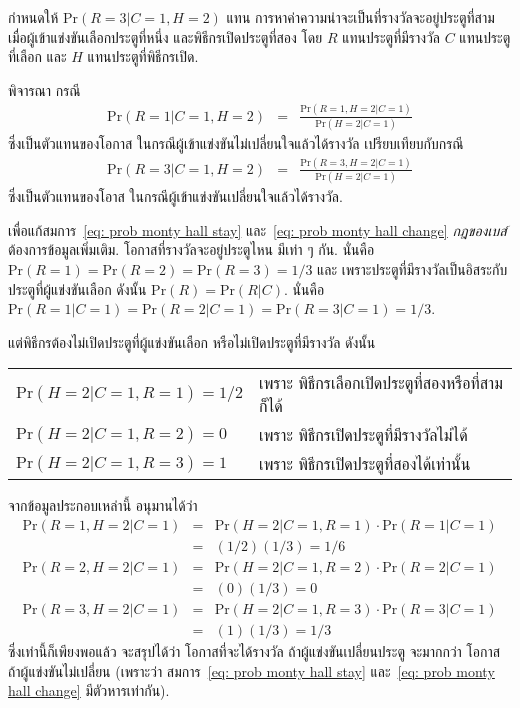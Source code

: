 กำหนดให้
$\mathrm{Pr}(R = 3|C = 1, H = 2)$
แทน
การหาค่าความน่าจะเป็นที่รางวัลจะอยู่ประตูที่สาม
เมื่อผู้เข้าแข่งขันเลือกประตูที่หนึ่ง
และพิธีกรเปิดประตูที่สอง
โดย $R$ แทนประตูที่มีรางวัล
$C$ แทนประตูที่เลือก
และ $H$ แทนประตูที่พิธีกรเปิด.

พิจารณา กรณี
\begin{eqnarray}
\mathrm{Pr}(R = 1| C = 1, H = 2) &=& \frac{\mathrm{Pr}(R = 1, H = 2| C = 1)}{\mathrm{Pr}(H = 2| C = 1)}
\label{eq: prob monty hall stay}
\end{eqnarray}
ซึ่งเป็นตัวแทนของโอกาส 
ในกรณีผู้เข้าแข่งขันไม่เปลี่ยนใจแล้วได้รางวัล
เปรียบเทียบกับกรณี
\begin{eqnarray}
\mathrm{Pr}(R = 3| C = 1, H = 2) &=& \frac{\mathrm{Pr}(R = 3, H = 2| C = 1)}{\mathrm{Pr}(H = 2| C = 1)}
\label{eq: prob monty hall change}
\end{eqnarray}
ซึ่งเป็นตัวแทนของโอาส
ในกรณีผู้เข้าแข่งขันเปลี่ยนใจแล้วได้รางวัล.

เพื่อแก้สมการ~\ref{eq: prob monty hall stay}
และ~\ref{eq: prob monty hall change} 
\textit{กฎของเบส์}
ต้องการข้อมูลเพิ่มเติม.
โอกาสที่รางวัลจะอยู่ประตูไหน มีเท่า ๆ กัน.
นั่นคือ
$\mathrm{Pr}(R = 1) = \mathrm{Pr}(R = 2) = \mathrm{Pr}(R = 3) = 1/3$
และ เพราะประตูที่มีรางวัลเป็นอิสระกับประตูที่ผู้แข่งขันเลือก ดังนั้น $\mathrm{Pr}(R) = \mathrm{Pr}(R|C)$.
นั่นคือ
$\mathrm{Pr}(R = 1|C = 1) = \mathrm{Pr}(R = 2|C = 1) = \mathrm{Pr}(R = 3|C = 1) = 1/3$.

แต่พิธีกรต้องไม่เปิดประตูที่ผู้แข่งขันเลือก หรือไม่เปิดประตูที่มีรางวัล ดังนั้น
\\
\begin{tabular}{ll}
$\mathrm{Pr}(H = 2|C = 1, R = 1) = 1/2$ &
เพราะ พิธีกรเลือกเปิดประตูที่สองหรือที่สามก็ได้
\\
$\mathrm{Pr}(H = 2|C = 1, R = 2) = 0$ &
เพราะ พิธีกรเปิดประตูที่มีรางวัลไม่ได้
\\
$\mathrm{Pr}(H = 2|C = 1, R = 3) = 1$ &
เพราะ พิธีกรเปิดประตูที่สองได้เท่านั้น
\end{tabular}

จากข้อมูลประกอบเหล่านี้
อนุมานได้ว่า 
\begin{eqnarray}
\mathrm{Pr}(R = 1, H = 2| C = 1) 
&=& 
\mathrm{Pr}(H =2 | C = 1, R = 1) \cdot \mathrm{Pr}(R = 1| C= 1)
\nonumber \\
&=& (1/2) (1/3) = 1/6
\nonumber \\
\mathrm{Pr}(R = 2, H = 2| C = 1) 
&=& 
\mathrm{Pr}(H =2 | C = 1, R = 2) \cdot \mathrm{Pr}(R = 2| C= 1)
\nonumber \\
&=& (0) (1/3) = 0
\nonumber \\
\mathrm{Pr}(R = 3, H = 2| C = 1) 
&=& 
\mathrm{Pr}(H =2 | C = 1, R = 3) \cdot \mathrm{Pr}(R = 3| C= 1)
\nonumber \\
&=& (1) (1/3) = 1/3
\nonumber
\end{eqnarray}
ซึ่งเท่านี้ก็เพียงพอแล้ว จะสรุปได้ว่า
โอกาสที่จะได้รางวัล ถ้าผู้แข่งขันเปลี่ยนประตู จะมากกว่า โอกาสถ้าผู้แข่งขันไม่เปลี่ยน
(เพราะว่า
สมการ~\ref{eq: prob monty hall stay}
และ~\ref{eq: prob monty hall change}
มีตัวหารเท่ากัน).

